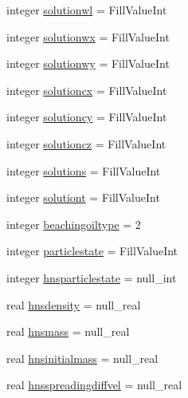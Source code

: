 \begin{DoxyCompactItemize}
\item 
integer \mbox{\hyperlink{structmodulelagrangianglobal_1_1t__partic_ab8fa0fedb6b017fe405bf671eb35b77b}{solutionwl}} = Fill\+Value\+Int
\item 
integer \mbox{\hyperlink{structmodulelagrangianglobal_1_1t__partic_a0478bfbaa09ed841de1798861c7d272d}{solutionwx}} = Fill\+Value\+Int
\item 
integer \mbox{\hyperlink{structmodulelagrangianglobal_1_1t__partic_a8541802a8c648467a7b231384ac472c5}{solutionwy}} = Fill\+Value\+Int
\item 
integer \mbox{\hyperlink{structmodulelagrangianglobal_1_1t__partic_acfe93d20c3290851f725b14c9548c289}{solutioncx}} = Fill\+Value\+Int
\item 
integer \mbox{\hyperlink{structmodulelagrangianglobal_1_1t__partic_acf20ec3a3cd24bf962f978d04e2908f8}{solutioncy}} = Fill\+Value\+Int
\item 
integer \mbox{\hyperlink{structmodulelagrangianglobal_1_1t__partic_aa71ae041d42a85299f804c812a782dc1}{solutioncz}} = Fill\+Value\+Int
\item 
integer \mbox{\hyperlink{structmodulelagrangianglobal_1_1t__partic_ac53559faa196ccea4a52527ba5a7cdea}{solutions}} = Fill\+Value\+Int
\item 
integer \mbox{\hyperlink{structmodulelagrangianglobal_1_1t__partic_a671fd7281e783b51c5095d93b563d83f}{solutiont}} = Fill\+Value\+Int
\item 
integer \mbox{\hyperlink{structmodulelagrangianglobal_1_1t__partic_addf9c8dbea36997376297a6b54245140}{beachingoiltype}} = 2
\item 
integer \mbox{\hyperlink{structmodulelagrangianglobal_1_1t__partic_a8e272b0f066c856533145a658d5a25a3}{particlestate}} = Fill\+Value\+Int
\item 
integer \mbox{\hyperlink{structmodulelagrangianglobal_1_1t__partic_a5d1819eb1976f8ce0fcd25683ca98b42}{hnsparticlestate}} = null\+\_\+int
\item 
real \mbox{\hyperlink{structmodulelagrangianglobal_1_1t__partic_a0dd3eaff0b3877d7207cd119c02fe40f}{hnsdensity}} = null\+\_\+real
\item 
real \mbox{\hyperlink{structmodulelagrangianglobal_1_1t__partic_ac852765b0fdb43b95f2bdeb6a7d1c33c}{hnsmass}} = null\+\_\+real
\item 
real \mbox{\hyperlink{structmodulelagrangianglobal_1_1t__partic_ada2a63f6e2e8f426eded9beb7e443c97}{hnsinitialmass}} = null\+\_\+real
\item 
real \mbox{\hyperlink{structmodulelagrangianglobal_1_1t__partic_ab419889b5c0aba8aacda8b46a9cef5dc}{hnsspreadingdiffvel}} = null\+\_\+real

\end{DoxyCompactItemize}
